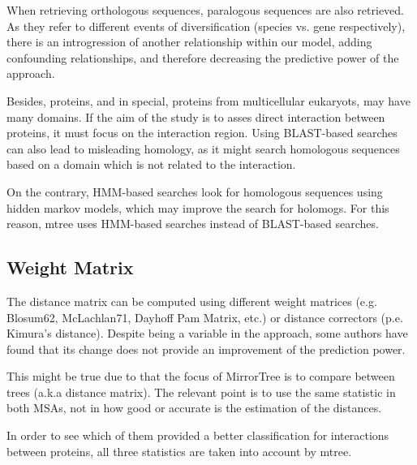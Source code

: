 \documentclass[11pt]{article}
\begin{document}
When retrieving orthologous sequences, paralogous sequences are also retrieved. As they refer to different events of diversification (species vs. gene respectively), there is an introgression of another relationship within our model, adding confounding relationships, and therefore decreasing the predictive power of the approach.

Besides, proteins, and in special, proteins from multicellular eukaryots, may have many domains. If the aim of the study is to asses direct interaction between proteins, it must focus on the interaction region. Using BLAST-based searches can also lead to misleading homology, as it might search homologous sequences based on a domain which is not related to the interaction.

On the contrary, HMM-based searches look for homologous sequences using hidden markov models, which may improve the search for holomogs. For this reason, mtree uses HMM-based searches instead of BLAST-based searches.

\subsection{Weight Matrix}
The distance matrix can be computed using different weight matrices (e.g. Blosum62, McLachlan71, Dayhoff Pam Matrix, etc.) or distance correctors (p.e. Kimura's distance). Despite being a variable in the approach, some authors\cite{Zhou13} have found that its change does not provide an improvement of the prediction power.

This might be true due to that the focus of MirrorTree is to compare between trees (a.k.a distance matrix). The relevant point is to use the same statistic in both MSAs, not in how good or accurate is the estimation of the distances.

In order to see which of them provided a better classification for interactions between proteins, all three statistics are taken into account by mtree.
\end{document}
